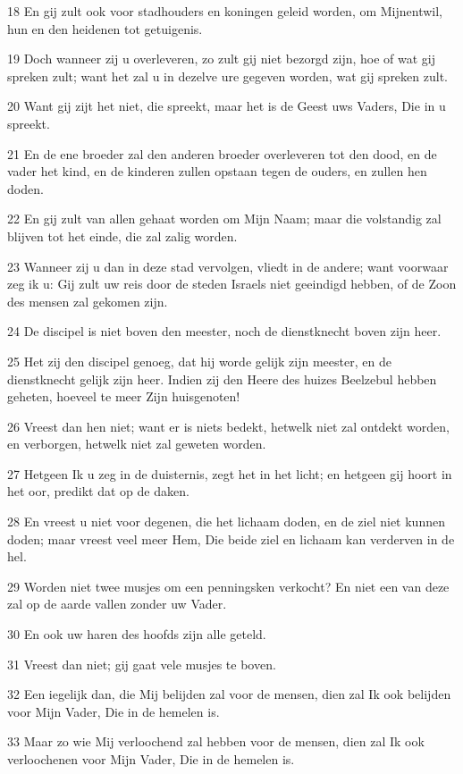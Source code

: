 \par 18 En gij zult ook voor stadhouders en koningen geleid worden, om Mijnentwil, hun en den heidenen tot getuigenis.
\par 19 Doch wanneer zij u overleveren, zo zult gij niet bezorgd zijn, hoe of wat gij spreken zult; want het zal u in dezelve ure gegeven worden, wat gij spreken zult.
\par 20 Want gij zijt het niet, die spreekt, maar het is de Geest uws Vaders, Die in u spreekt.
\par 21 En de ene broeder zal den anderen broeder overleveren tot den dood, en de vader het kind, en de kinderen zullen opstaan tegen de ouders, en zullen hen doden.
\par 22 En gij zult van allen gehaat worden om Mijn Naam; maar die volstandig zal blijven tot het einde, die zal zalig worden.
\par 23 Wanneer zij u dan in deze stad vervolgen, vliedt in de andere; want voorwaar zeg ik u: Gij zult uw reis door de steden Israels niet geeindigd hebben, of de Zoon des mensen zal gekomen zijn.
\par 24 De discipel is niet boven den meester, noch de dienstknecht boven zijn heer.
\par 25 Het zij den discipel genoeg, dat hij worde gelijk zijn meester, en de dienstknecht gelijk zijn heer. Indien zij den Heere des huizes Beelzebul hebben geheten, hoeveel te meer Zijn huisgenoten!
\par 26 Vreest dan hen niet; want er is niets bedekt, hetwelk niet zal ontdekt worden, en verborgen, hetwelk niet zal geweten worden.
\par 27 Hetgeen Ik u zeg in de duisternis, zegt het in het licht; en hetgeen gij hoort in het oor, predikt dat op de daken.
\par 28 En vreest u niet voor degenen, die het lichaam doden, en de ziel niet kunnen doden; maar vreest veel meer Hem, Die beide ziel en lichaam kan verderven in de hel.
\par 29 Worden niet twee musjes om een penningsken verkocht? En niet een van deze zal op de aarde vallen zonder uw Vader.
\par 30 En ook uw haren des hoofds zijn alle geteld.
\par 31 Vreest dan niet; gij gaat vele musjes te boven.
\par 32 Een iegelijk dan, die Mij belijden zal voor de mensen, dien zal Ik ook belijden voor Mijn Vader, Die in de hemelen is.
\par 33 Maar zo wie Mij verloochend zal hebben voor de mensen, dien zal Ik ook verloochenen voor Mijn Vader, Die in de hemelen is.
